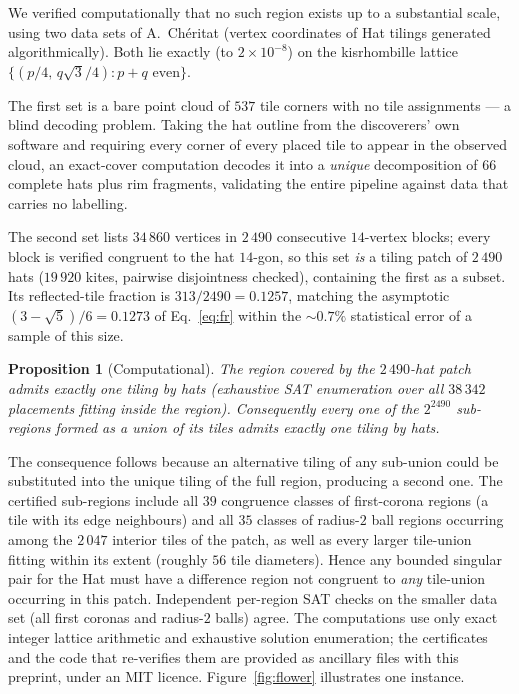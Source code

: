 \documentclass[a4paper,unpublished]{quantumarticle}
\newtheorem{proposition}[theorem]{Proposition}
\theoremstyle{remark}
\begin{document}
We verified computationally that no such region exists up to a
substantial scale, using two data sets of A.\ Ch\'eritat (vertex
coordinates of Hat tilings generated algorithmically). Both lie
exactly (to $2 \times 10^{-8}$) on the kisrhombille lattice
$\{(p/4,\, q\sqrt{3}/4) : p + q \text{ even}\}$.

The first set is a bare point cloud of $537$ tile corners with no
tile assignments --- a blind decoding problem. Taking the hat outline
from the discoverers' own software \cite{KaplanHatviz} and requiring
every corner of every placed tile to appear in the observed cloud, an
exact-cover computation decodes it into a \emph{unique} decomposition
of $66$ complete hats plus rim fragments, validating the entire
pipeline against data that carries no labelling.

The second set lists $34\,860$ vertices in $2\,490$ consecutive
$14$-vertex blocks; every block is verified congruent to the hat
$14$-gon, so this set \emph{is} a tiling patch of $2\,490$ hats
($19\,920$ kites, pairwise disjointness checked), containing the
first as a subset. Its reflected-tile fraction is
$313/2490 = 0.1257$, matching the asymptotic
$(3-\sqrt{5})/6 = 0.1273$ of Eq.~\eqref{eq:fr} within the
$\sim\!0.7\%$ statistical error of a sample of this size.

\begin{proposition}[Computational]
\label{prop:computational}
The region covered by the $2\,490$-hat patch admits exactly one
tiling by hats (exhaustive SAT enumeration over all $38\,342$
placements fitting inside the region). Consequently every one of the
$2^{2490}$ sub-regions formed as a union of its tiles admits exactly
one tiling by hats.
\end{proposition}

The consequence follows because an alternative tiling of any
sub-union could be substituted into the unique tiling of the full
region, producing a second one. The certified sub-regions include all
$39$ congruence classes of first-corona regions (a tile with its edge
neighbours) and all $35$ classes of radius-$2$ ball regions occurring
among the $2\,047$ interior tiles of the patch, as well as every
larger tile-union fitting within its extent (roughly $56$ tile
diameters). Hence any bounded singular pair for the Hat must have a
difference region not congruent to \emph{any} tile-union occurring in
this patch. Independent per-region SAT checks on the smaller data set
(all first coronas and radius-$2$ balls) agree. The computations use
only exact integer lattice arithmetic and exhaustive solution
enumeration; the certificates and the code that re-verifies them are
provided as ancillary files with this preprint, under an MIT licence.
Figure~\ref{fig:flower} illustrates one instance.
\end{document}
